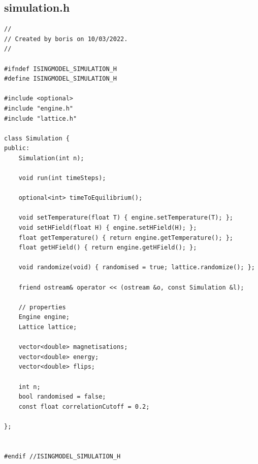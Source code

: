 \documentclass[a4paper, 12pt]{article}
\begin{document}
\subsection{simulation.h}
\begin{lstlisting}
//
// Created by boris on 10/03/2022.
//

#ifndef ISINGMODEL_SIMULATION_H
#define ISINGMODEL_SIMULATION_H

#include <optional>
#include "engine.h"
#include "lattice.h"

class Simulation {
public:
    Simulation(int n);

    void run(int timeSteps);

    optional<int> timeToEquilibrium();

    void setTemperature(float T) { engine.setTemperature(T); };
    void setHField(float H) { engine.setHField(H); };
    float getTemperature() { return engine.getTemperature(); };
    float getHField() { return engine.getHField(); };

    void randomize(void) { randomised = true; lattice.randomize(); };

    friend ostream& operator << (ostream &o, const Simulation &l);

    // properties
    Engine engine;
    Lattice lattice;

    vector<double> magnetisations;
    vector<double> energy;
    vector<double> flips;

    int n;
    bool randomised = false;
    const float correlationCutoff = 0.2;

};


#endif //ISINGMODEL_SIMULATION_H
\end{lstlisting}

\newpage
\end{document}
